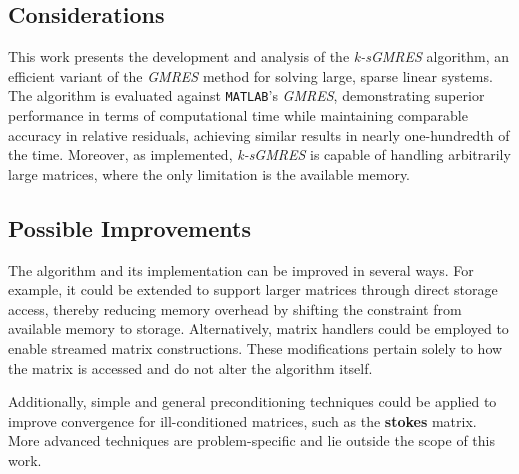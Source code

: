 \subsection{Considerations}

This work presents the development and analysis of the \textit{k-sGMRES} algorithm, an efficient variant of the \textit{GMRES} method for solving large, sparse linear systems. The algorithm is evaluated against \lstinline{MATLAB}'s \textit{GMRES}, demonstrating superior performance in terms of computational time while maintaining comparable accuracy in relative residuals, achieving similar results in nearly one-hundredth of the time. Moreover, as implemented, \textit{k-sGMRES} is capable of handling arbitrarily large matrices, where the only limitation is the available memory.

\subsection{Possible Improvements}

The algorithm and its implementation can be improved in several ways. For example, it could be extended to support larger matrices through direct storage access, thereby reducing memory overhead by shifting the constraint from available memory to storage. Alternatively, matrix handlers could be employed to enable streamed matrix constructions. These modifications pertain solely to how the matrix is accessed and do not alter the algorithm itself.

Additionally, simple and general preconditioning techniques could be applied to improve convergence for ill-conditioned matrices, such as the \textbf{stokes} matrix. More advanced techniques are problem-specific and lie outside the scope of this work.